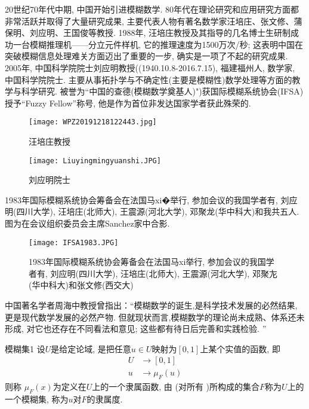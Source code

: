 20世纪70年代中期, 中国开始引进模糊数学. 80年代在理论研究和应用研究方面都非常活跃并取得了大量研究成果, 主要代表人物有著名数学家汪培庄、张文修、蒲保明、刘应明、王国俊等教授. 1988年, 汪培庄教授及其指导的几名博士生研制成功一台模糊推理机——分立元件样机, 它的推理速度为1500万次/秒; 这表明中国在突破模糊信息处理难关方面迈出了重要的一步, 确实是一项了不起的研究成果. 2005年, 中国科学院院士刘应明教授((1940.10.8-2016.7.15), 福建福州人, 数学家, 中国科学院院士. 主要从事拓扑学与不确定性(主要是模糊性)数学处理等方面的教学与科学研究. 被誉为“中国的查德(模糊数学奠基人)")获国际模糊系统协会(IFSA)授予“Fuzzy Fellow”称号, 他是作为首位非发达国家学者获此殊荣的.
\begin{figure}[H]
\centering
\texttt{[image: WPZ20191218122443.jpg]}
\caption{汪培庄教授}
\label{WPZ20191218122443}
\end{figure}
\begin{figure}[H]
\centering
\texttt{[image: Liuyingmingyuanshi.JPG]}
\caption{刘应明院士}
\label{WPZ20191218122443}
\end{figure}
1983年国际模糊系统协会筹备会在法国马xi�举行, 参加会议的我国学者有, 刘应明(四川大学), 汪培庄(北师大), 王震源(河北大学), 邓聚龙(华中科大)和我共五人. 图为在会议组织委员会主席Sanchez家中合影.

\begin{figure}[H]
\centering
\texttt{[image: IFSA1983.JPG]}
\caption{1983年国际模糊系统协会筹备会在法国马xi举行, 参加会议的我国学者有, 刘应明(四川大学), 汪培庄(北师大), 王震源(河北大学), 邓聚㔫(华中科大)和张文修(西交大)}
\label{WPZ20191218122443}
\end{figure}
中国著名学者周海中教授曾指出：“模糊数学的诞生,是科学技术发展的必然结果, 更是现代数学发展的必然产物. 但就现状而言,模糊数学的理论尚未成熟、体系还未形成, 对它也还存在不同看法和意见; 这些都有待日后完善和实践检验. ”
\begin{mydef}{模糊集}{1}
设$U$是给定论域,   是把任意$u\in U$映射为$[0, 1]$上某个实值的函数, 即
\begin{align}
  U&\rightarrow [0, 1]\\
  u&\rightarrow \mu_F(u)
\end{align}
则称 $ \mu_F(x)$为定义在$U$上的一个隶属函数, 由   (对所有    )所构成的集合$F$称为$U$上的一个模糊集, 称为$u$对$F$的隶属度.
\end{mydef}

